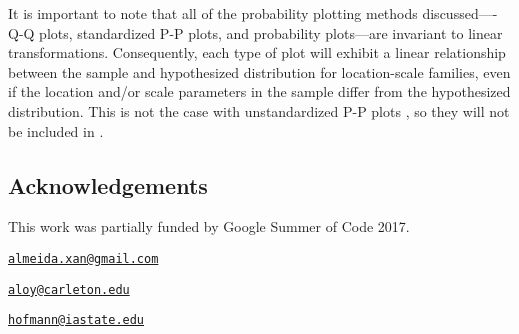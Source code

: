 It is important to note that all of the probability plotting methods
discussed----Q-Q plots, standardized P-P plots, and probability
plots---are invariant to linear transformations. Consequently, each type
of plot will exhibit a linear relationship between the sample and
hypothesized distribution for location-scale families, even if the
location and/or scale parameters in the sample differ from the
hypothesized distribution. This is not the case with unstandardized P-P
plots \citep{Wilk1968-ii}, so they will not be included in
.



\subsection{Acknowledgements}\label{acknowledgements}

This work was partially funded by Google Summer of Code 2017.

\address{%
Alexandre Almeida\\
University of Campinas\\
Institute of Computing\\ Campinas, Brazil 13083-852\\
}
\href{mailto:almeida.xan@gmail.com}{\nolinkurl{almeida.xan@gmail.com}}

\address{%
Adam Loy\\
Carleton College\\
Department of Mathematics and Statistics\\ Northfield, MN 55057\\
}
\href{mailto:aloy@carleton.edu}{\nolinkurl{aloy@carleton.edu}}

\address{%
Heike Hofmann\\
Iowa State University\\
Department of Statistics\\ Ames, IA 50011-1210\\
}
\href{mailto:hofmann@iastate.edu}{\nolinkurl{hofmann@iastate.edu}}

